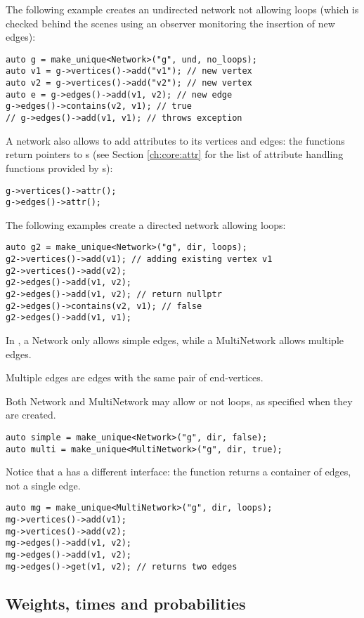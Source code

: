 The following example creates an undirected network not allowing loops (which is checked behind the scenes using an observer monitoring the insertion of new edges):
\begin{lstlisting}[style=c++]
auto g = make_unique<Network>("g", und, no_loops);
auto v1 = g->vertices()->add("v1"); // new vertex
auto v2 = g->vertices()->add("v2"); // new vertex
auto e = g->edges()->add(v1, v2); // new edge
g->edges()->contains(v2, v1); // true
// g->edges()->add(v1, v1); // throws exception
\end{lstlisting}
A network also allows to add attributes to its vertices and edges: the  functions return pointers to s (see Section \ref{ch:core:attr} for the list of attribute handling functions provided by s):
\begin{lstlisting}[style=c++]
g->vertices()->attr();
g->edges()->attr();
\end{lstlisting}
The following examples create a directed network allowing loops:
\begin{lstlisting}[style=c++]
auto g2 = make_unique<Network>("g", dir, loops);
g2->vertices()->add(v1); // adding existing vertex v1
g2->vertices()->add(v2);
g2->edges()->add(v1, v2);
g2->edges()->add(v1, v2); // return nullptr
g2->edges()->contains(v2, v1); // false
g2->edges()->add(v1, v1);
\end{lstlisting}
In , a Network only allows simple edges, while a MultiNetwork allows multiple edges. 
\begin{definition}
Multiple edges are edges with the same pair of end-vertices.
\end{definition}
Both Network and MultiNetwork may allow or not loops, as specified when they are created.
\begin{lstlisting}[style=c++]
auto simple = make_unique<Network>("g", dir, false);
auto multi = make_unique<MultiNetwork>("g", dir, true);
\end{lstlisting}
Notice that a  has a different interface: the function  returns a container of edges, not a single edge.
\begin{lstlisting}[style=c++]
auto mg = make_unique<MultiNetwork>("g", dir, loops);
mg->vertices()->add(v1);
mg->vertices()->add(v2);
mg->edges()->add(v1, v2);
mg->edges()->add(v1, v2);
mg->edges()->get(v1, v2); // returns two edges
\end{lstlisting}

\subsection{Weights, times and probabilities}

